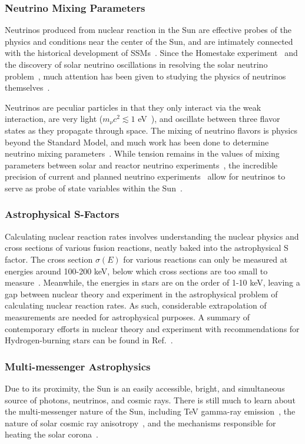 \documentclass[12pt]{article}
\begin{document}
\subsubsection{Neutrino Mixing Parameters}
Neutrinos produced from nuclear reaction in the Sun are effective probes of the physics and conditions near the center of the Sun, and are intimately connected with the historical development of SSMs~\cite{bahcall1989neutrino}. Since the Homestake experiment~\cite{DAVIS199413} and the discovery of solar neutrino oscillations in resolving the solar neutrino problem~\cite{SNoscillations}, much attention has been given to studying the physics of neutrinos themselves~\cite{Xu_2023}. 

Neutrinos are peculiar particles in that they only interact via the weak interaction, are very light ($m_\nu c^2 \lesssim 1$ eV~\cite{Burros1987}), and oscillate between three flavor states as they propagate through space. The mixing of neutrino flavors is physics beyond the Standard Model, and much work has been done to determine neutrino mixing parameters~\cite{Esteban2018,deSalas2020}. While tension remains in the values of mixing parameters between solar and reactor neutrino experiments~\cite{SK2024}, the incredible precision of current and planned neutrino experiments~\cite{Capozzi2019} allow for neutrinos to serve as probe of state variables within the Sun~\cite{LaberSmith:2024}.

\subsubsection{Astrophysical S-Factors}
Calculating nuclear reaction rates involves understanding the nuclear physics and cross sections of various fusion reactions, neatly baked into the astrophysical S factor. The cross section $\sigma(E)$ for various reactions can only be measured at energies around 100-200 keV, below which cross sections are too small to measure~\cite{Cox_Giuli_vol1,Acharya2024}. Meanwhile, the energies in stars are on the order of 1-10 keV, leaving a gap between nuclear theory and experiment in the astrophysical problem of calculating nuclear reaction rates. As such, considerable extrapolation of measurements are needed for astrophysical purposes. A summary of contemporary efforts in nuclear theory and experiment with recommendations for Hydrogen-burning stars can be found in Ref.~\cite{Acharya2024}.

\subsubsection{Multi-messenger Astrophysics}
Due to its proximity, the Sun is an easily accessible, bright, and simultaneous source of photons, neutrinos, and cosmic rays. There is still much to learn about the multi-messenger nature of the Sun, including TeV gamma-ray emission~\cite{Zhou2016}, the nature of solar cosmic ray anisotropy~\cite{Bartoli2015}, and the mechanisms responsible for heating the solar corona~\cite{Aschwanden2005}.
\end{document}

